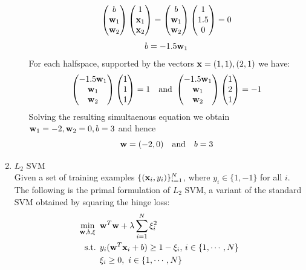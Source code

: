 \documentclass{article}
\def\x{{\bf x}}
\def\w{{\bf w}}
\begin{document}
\begin{enumerate}
\begin{itemize}
{    $$ 
        \left(\begin{matrix}
        b \\ \w_1\\ \w_2 
    \end{matrix}
        \right) 
        \left(\begin{matrix}
            1 \\ \x_1\\ \x_2
        \end{matrix}
            \right) = 
        \left(\begin{matrix}
                b \\ \w_1\\ \w_2 
        \end{matrix}
        \right) 
        \left(\begin{matrix}
         1 \\ 1.5\\ 0
        \end{matrix}
            \right)  = 0
    $$
    $$
        b = -1.5\w_1
    $$
    For each halfspace, supported by  the vectors $\x = (1,1),  (2,1)$ we have:
    $$
        \left(\begin{matrix}
            -1.5\w_1 \\ \w_1\\ \w_2 
        \end{matrix}
            \right) 
            \left(\begin{matrix}
                1 \\ 1\\ 1
            \end{matrix}
                \right) = 1 \quad \hbox{and }
            \left(\begin{matrix}
                   -1.5\w_1 \\ \w_1\\ \w_2 
            \end{matrix}
            \right) 
            \left(\begin{matrix}
             1 \\ 2\\ 1
            \end{matrix}
                \right)  = -1
    $$
    Solving the resulting simultaenous equation we obtain $\w_1 = -2, \w_2 =0, b = 3$ and hence
    $$
        \w = (-2, 0)\quad\hbox{and}\quad b = 3
    $$
}
\end{itemize}

\item $L_2$ SVM\\
Given a set of training examples $\{(\x_i, y_i)\}_{i=1}^N$, where $y_i\in \{1, -1\}$ for all $i$. The following is the primal formulation of $L_2$ SVM, a variant of the standard SVM obtained by squaring the hinge loss:
\begin{align*}
\min_{\w, b, \xi} \mbox{ }& \w^T\w+\lambda\sum_{i=1}^N \xi_i^2 \\
\mbox{s.t. } & y_i(\w^T\x_i+b)\geq 1-\xi_i \mbox{,   } i \in \{1,\cdots,N\}\\
 & \xi_i\geq 0, \mbox{  }  i\in \{1,\cdots,N\}
\end{align*}


\end{enumerate}
\end{document}
